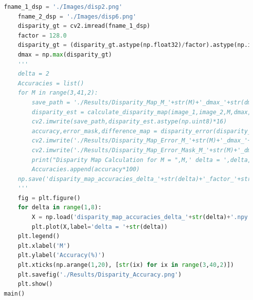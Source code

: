\documentclass{article}
\begin{document}
\begin{lstlisting}[language=Python]
	fname_1_dsp = './Images/disp2.png'
	fname_2_dsp = './Images/disp6.png'
	disparity_gt = cv2.imread(fname_1_dsp)
	factor = 128.0
	disparity_gt = (disparity_gt.astype(np.float32)/factor).astype(np.int8)
	dmax = np.max(disparity_gt)
	'''
	delta = 2
	Accuracies = list()
	for M in range(3,41,2):
		save_path = './Results/Disparity_Map_M_'+str(M)+'_dmax_'+str(dmax)+'.png'
		disparity_est = calculate_disparity_map(image_1,image_2,M,dmax,names)
		cv2.imwrite(save_path,disparity_est.astype(np.uint8)*16)
		accuracy,error_mask,difference_map = disparity_error(disparity_gt,disparity_est,delta=delta)
		cv2.imwrite('./Results/Disparity_Map_Error_M_'+str(M)+'_dmax_'+str(dmax)+'.png',difference_map)
		cv2.imwrite('./Results/Disparity_Map_Error_Mask_M_'+str(M)+'_dmax_'+str(dmax)+'.png',error_mask.astype(np.uint8)*255)
		print("Disparity Map Calculation for M = ",M,' delta = ',delta,' Accuracy = ',accuracy*100)
		Accuracies.append(accuracy*100)
	np.save('disparity_map_accuracies_delta_'+str(delta)+'_factor_'+str(factor)+'.npy',Accuracies)
	'''
	fig = plt.figure()
	for delta in range(1,8):
		X = np.load('disparity_map_accuracies_delta_'+str(delta)+'.npy')
		plt.plot(X,label='delta = '+str(delta))
	plt.legend()
	plt.xlabel('M')
	plt.ylabel('Accuracy(%)')
	plt.xticks(np.arange(1,20), [str(ix) for ix in range(3,40,2)])
	plt.savefig('./Results/Disparity_Accuracy.png')
	plt.show()
main()


\end{lstlisting}
\end{document}
